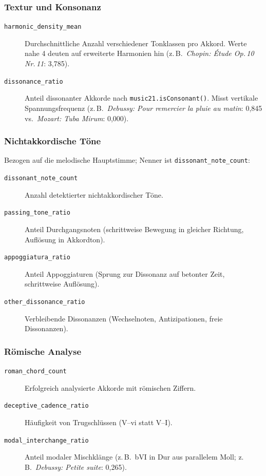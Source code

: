 \documentclass[12pt,a4paper]{article}
\theoremstyle{definition}
\begin{document}
\subsubsection*{Textur und Konsonanz}
\begin{description}
    \item[\texttt{harmonic\_density\_mean}] Durchschnittliche Anzahl verschiedener Tonklassen pro Akkord. Werte nahe 4 deuten auf erweiterte Harmonien hin (z.\,B.\ \emph{Chopin: Étude Op.\,10 Nr.\,11}: 3{,}785).
    
    \item[\texttt{dissonance\_ratio}] Anteil dissonanter Akkorde nach \texttt{music21.isConsonant()}. Misst vertikale Spannungsfrequenz (z.\,B.\ \emph{Debussy: Pour remercier la pluie au matin}: 0{,}845 vs.\ \emph{Mozart: Tuba Mirum}: 0{,}000).
\end{description}

\subsubsection*{Nichtakkordische Töne}
Bezogen auf die melodische Hauptstimme; Nenner ist \texttt{dissonant\_note\_count}:
\begin{description}
    \item[\texttt{dissonant\_note\_count}] Anzahl detektierter nichtakkordischer Töne.
    
    \item[\texttt{passing\_tone\_ratio}] Anteil Durchgangsnoten (schrittweise Bewegung in gleicher Richtung, Auflösung in Akkordton).
    
    \item[\texttt{appoggiatura\_ratio}] Anteil Appoggiaturen (Sprung zur Dissonanz auf betonter Zeit, schrittweise Auflösung).
    
    \item[\texttt{other\_dissonance\_ratio}] Verbleibende Dissonanzen (Wechselnoten, Antizipationen, freie Dissonanzen).
\end{description}

\subsubsection*{Römische Analyse}
\begin{description}
    \item[\texttt{roman\_chord\_count}] Erfolgreich analysierte Akkorde mit römischen Ziffern.
    
    \item[\texttt{deceptive\_cadence\_ratio}] Häufigkeit von Trugschlüssen (V--vi statt V--I).
    
    \item[\texttt{modal\_interchange\_ratio}] Anteil modaler Mischklänge (z.\,B.\ bVI in Dur aus parallelem Moll; z.\,B.\ \emph{Debussy: Petite suite}: 0{,}265).
\end{description}
\end{document}
